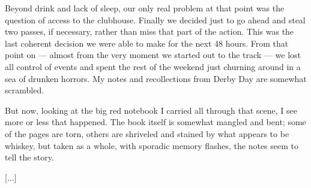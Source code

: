 \documentclass[9pt,a4paper]{extarticle}
\begin{document}
Beyond drink and lack of sleep, our only real problem at that point was the question of access to the clubhouse. Finally we decided just to go ahead and steal two passes, if necessary, rather than miss that part of the action. This was the last coherent decision we were able to make for the next 48 hours. From that point on — almost from the very moment we started out to the track — we lost all control of events and spent the rest of the weekend just churning around in a sea of drunken horrors. My notes and recollections from Derby Day are somewhat scrambled.

But now, looking at the big red notebook I carried all through that scene, I see more or less that happened. The book itself is somewhat mangled and bent; some of the pages are torn, others are shriveled and stained by what appears to be whiskey, but taken as a whole, with sporadic memory flashes, the notes seem to tell the story.

[...]
\end{document}
